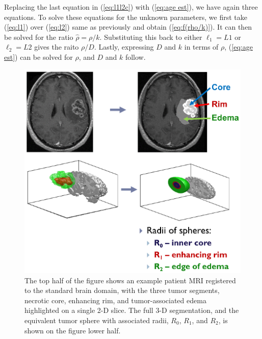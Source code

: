 \documentclass{aims}
\numberwithin{equation}{section}
\begin{document}
Replacing the last equation in (\ref{eq:l1l2c})
with (\ref{eq:age est}), we have again three equations. To solve these equations for the unknown parameters, we first take 
(\ref{eq:l1}) over (\ref{eq:l2}) same as previously and obtain (\ref{eq:f(rho/k)}). It can then be solved for the ratio $\hat{\rho}=\rho/k$. Substituting this back to either $\ell_1=L1$ or $\ell_2=L2$ gives the raito $\rho/D$. Lastly, expressing $D$ and $k$ in terms of $\rho$, (\ref{eq:age est}) can be solved for $\rho$, and $D$ and $k$ follow.

\begin{figure}
\begin{center}
\includegraphics[scale=0.81]{plots/radii_process.eps}\caption{\label{fig:radii_process} The top half of the figure shows an example patient MRI registered to the standard brain domain, with the three tumor segments, necrotic core, enhancing rim, and tumor-associated edema highlighted on a single 2-D slice.  The full 3-D segmentation, and the equivalent tumor sphere with associated radii, $R_0$, $R_1$, and $R_2$, is shown on the figure lower half.}
\end{center}
\end{figure}
\end{document}
